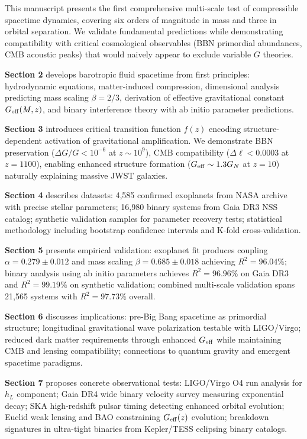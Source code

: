\documentclass[11pt,a4paper]{article}
\begin{document}
This manuscript presents the first comprehensive multi-scale test of
compressible spacetime dynamics, covering six orders of magnitude in
mass and three in orbital separation. We validate fundamental
predictions while demonstrating compatibility with critical cosmological
observables (BBN primordial abundances, CMB acoustic peaks) that would
naively appear to exclude variable \(G\) theories.

\textbf{Section 2} develops barotropic fluid spacetime from first
principles: hydrodynamic equations, matter-induced compression,
dimensional analysis predicting mass scaling \(\beta = 2/3\), derivation
of effective gravitational constant \(G_{\rm eff}(M,z)\), and binary
interference theory with ab initio parameter predictions.

\textbf{Section 3} introduces critical transition function \(f(z)\)
encoding structure-dependent activation of gravitational amplification.
We demonstrate BBN preservation (\(\Delta G/G < 10^{-6}\) at
\(z \sim 10^9\)), CMB compatibility (\(\Delta\ell < 0.0003\) at
\(z=1100\)), enabling enhanced structure formation
(\(G_{\rm eff} \sim 1.3 G_N\) at \(z=10\)) naturally explaining massive
JWST galaxies.

\textbf{Section 4} describes datasets: 4,585 confirmed exoplanets from
NASA archive with precise stellar parameters; 16,980 binary systems from
Gaia DR3 NSS catalog; synthetic validation samples for parameter
recovery tests; statistical methodology including bootstrap confidence
intervals and K-fold cross-validation.

\textbf{Section 5} presents empirical validation: exoplanet fit produces
coupling \(\alpha = 0.279 \pm 0.012\) and mass scaling
\(\beta = 0.685 \pm 0.018\) achieving \(R^2 = 96.04\%\); binary analysis
using ab initio parameters achieves \(R^2 = 96.96\%\) on Gaia DR3 and
\(R^2 = 99.19\%\) on synthetic validation; combined multi-scale
validation spans 21,565 systems with \(R^2 = 97.73\%\) overall.

\textbf{Section 6} discusses implications: pre-Big Bang spacetime as
primordial structure; longitudinal gravitational wave polarization
testable with LIGO/Virgo; reduced dark matter requirements through
enhanced \(G_{\rm eff}\) while maintaining CMB and lensing
compatibility; connections to quantum gravity and emergent spacetime
paradigms.

\textbf{Section 7} proposes concrete observational tests: LIGO/Virgo O4
run analysis for \(h_L\) component; Gaia DR4 wide binary velocity survey
measuring exponential decay; SKA high-redshift pulsar timing detecting
enhanced orbital evolution; Euclid weak lensing and BAO constraining
\(G_{\rm eff}(z)\) evolution; breakdown signatures in ultra-tight
binaries from Kepler/TESS eclipsing binary catalogs.
\end{document}
